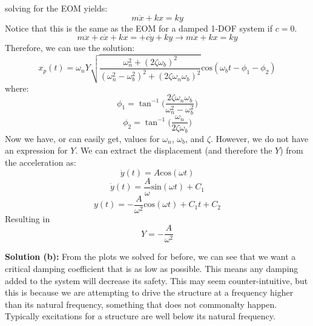 \documentclass[12pt,letter]{article}
\begin{document}
\begin{example}
			solving for the EOM yields:
			\begin{equation}
				m\ddot{x} + kx = ky
			\end{equation} 				
			Notice that this is the same as the EOM for a damped 1-DOF system if $c=0$.	
			\begin{equation}
			m\ddot{x} + c\dot{x} + kx = + c\dot{y} + ky \rightarrow m\ddot{x} + kx = ky
			\end{equation}
			Therefore, we can use the solution:
			\begin{equation}
				x_p(t) = 	\omega_n Y   \sqrt{\frac{\omega_n^2 + (2 \zeta \omega_b)^2 }{(\omega_n^2 - \omega_b^2)^2 +  (2\zeta \omega_n \omega_b)^2} }  \text{cos}(\omega_bt - \phi_1 - \phi_2)
			\end{equation}
			where:
			\begin{equation}
				\phi_1 = \tan^{-1} \bigg(\frac{2\zeta \omega_n \omega_b}{\omega_n^2 - \omega_b^2}\bigg)
			\end{equation}	
			\begin{equation}
				\phi_2 = \tan^{-1} \bigg(\frac{\omega_n}{2\zeta \omega_b}\bigg)
			\end{equation}
			Now we have, or can easily get, values for $\omega_n$, $\omega_b$, and $\zeta$. However, we do not have an expression for $Y$. We can extract the displacement (and therefore the $Y$) from the acceleration as:
			\begin{equation}
				\ddot{y}(t) = A \text{cos}(\omega t)
			\end{equation} 				
			\begin{equation}
				\dot{y}(t) = \frac{A}{\omega} \text{sin}(\omega t) + C_1
			\end{equation} 					
			\begin{equation}
				y(t) = - \frac{A}{\omega^2} \text{cos}(\omega t) + C_1t + C_2
			\end{equation} 					
			Resulting in 
			\begin{equation}
				Y = -\frac{A}{\omega^2}
			\end{equation} 			
			
			\noindent\textbf{Solution (b):} From the plots we solved for before, we can see that we want a critical damping coefficient that is as low as possible. This means any damping added to the system will decrease its safety. This may seem counter-intuitive, but this is because we are attempting to drive the structure at a frequency higher than its natural frequency, something that does not commonalty happen. Typically excitations for a structure are well below its natural frequency.  			
		
		\end{example}			
\end{document}
